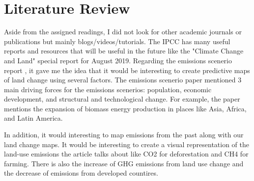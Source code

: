 \documentclass[a4paper,10pt]{article}
\begin{document}
\section{Literature Review}
Aside from the assigned readings, I did not look for other academic journals or publications but mainly blogs/videos/tutorials. The IPCC has many useful 
reports and resources that will be useful in the future like the "Climate Change and Land" special report for August 2019. Regarding the emissions scenerio 
report \cite{ipcc2000}, it gave me the idea that it would be interesting to create predictive maps of land change using several 
factors. The emissions scenerio paper mentioned 3 main driving forces for the emissions scenerios: population, economic development, and structural and technological change. 
For example, the paper mentions the expansion of biomass energy production in places like Asia, Africa, and Latin America. 

In addition, it would interesting to map emissions from the past along with our land change maps. It would be interesting to create a visual representation of the land-use 
emissions the article talks about like CO2 for deforestation and CH4 for farming. There is also the increase of GHG emissions from land use change and the decrease of emissions 
from developed countires. 




\end{document}
